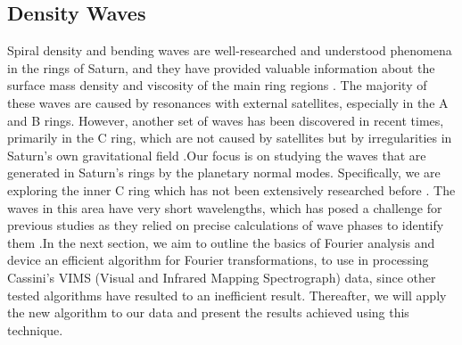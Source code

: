 \documentclass{article}
\begin{document}
\subsection{Density Waves}
Spiral density and bending waves are well-researched and understood phenomena in the rings of Saturn, and they have provided valuable information about the surface mass density and viscosity of the main ring regions \cite{2009sfch.book..375C}\cite{Hedman_2013}\cite{2020AGUA....100142M}. The majority of these waves are caused by resonances with external satellites, especially in the A and B rings. However, another set of waves has been discovered in recent times, primarily in the C ring, which are not caused by satellites but by irregularities in Saturn's own gravitational field \cite{Hedman_2013}\cite{2014MNRAS.444.1369H}\cite{Hedman_2018}.Our focus is on studying the waves that are generated in Saturn's rings by the planetary normal modes. Specifically, we are exploring the inner C ring which has not been extensively researched before \cite{FRENCH2019599}\cite{Hedman_2013}. The waves in this area have very short wavelengths, which has posed a challenge for previous studies as they relied on precise calculations of wave phases to identify them \cite{FRENCH2019599}\cite{Hedman_2013}\cite{Hedman_2018}\cite{Tiscareno_2007}.In the next section, we aim to outline the basics of Fourier analysis and device an efficient algorithm for Fourier transformations, to use in processing Cassini's VIMS (Visual and Infrared Mapping Spectrograph) data, since other tested algorithms have resulted to an inefficient result. Thereafter, we will apply the new algorithm to our data and present the results achieved using this technique.




\end{document}
